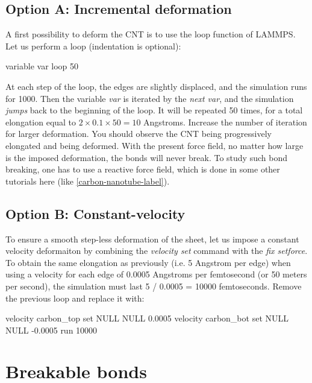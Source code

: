 \subsection{Option A: Incremental deformation}

\noindent A first possibility to deform the CNT is to 
use the loop function of LAMMPS. 
Let us perform a loop (indentation is optional):

\begin{lcverbatim}
variable var loop 50
\end{lcverbatim}

\noindent At each step of the loop, the edges are slightly displaced, and
the simulation runs for 1000. Then the variable \textit{var} is iterated
by the \textit{next var}, and the simulation \textit{jumps} back to the beginning of 
the loop. It will be repeated 50 times, for a total elongation
equal to $2 \times 0.1 \times 50 = 10$ Angstroms. Increase the number of iteration 
for larger deformation.
You should observe the CNT being progressively elongated
and being deformed.
With the present force field, no matter how large is the
imposed deformation, the bonds will never break. To study
such bond breaking, one has to use a reactive force
field, which is done in some other tutorials here (like \ref{carbon-nanotube-label}).

\subsection{Option B: Constant-velocity}

\noindent To ensure a smooth step-less deformation of the sheet,
let us impose a constant velocity deformaiton by combining
the \textit{velocity set} command with the \textit{fix setforce}. 
To obtain the same elongation as previously (i.e. 5 Angstrom 
per edge) when using a velocity for each edge of 0.0005 Angstroms per
femtosecond (or 50 meters per second), the simulation 
must last 5 / 0.0005 = 10000 femtoseconds. 
Remove the previous loop and replace it with:

\begin{lcverbatim}
velocity carbon_top set NULL NULL 0.0005
velocity carbon_bot set NULL NULL -0.0005
run 10000
\end{lcverbatim}

\noindent \section{Breakable bonds}

